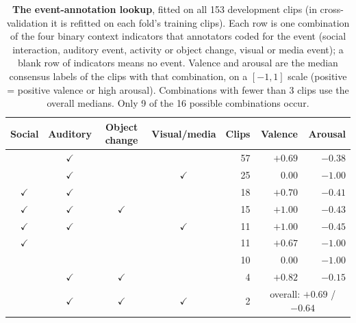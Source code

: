 \documentclass[11pt]{article}
\begin{document}
\begin{table}[!htbp]
\centering
\caption{\textbf{The event-annotation lookup}, fitted on all 153 development clips (in cross-validation it is refitted on each fold's training clips).
Each row is one combination of the four binary context indicators that annotators coded for the event (social interaction, auditory event, activity or object change, visual or media event); a blank row of indicators means no event. Valence and arousal are the median consensus labels of the clips with that combination, on a $[-1, 1]$ scale (positive = positive valence or high arousal). Combinations with fewer than 3 clips use the overall medians. Only 9 of the 16 possible combinations occur.}
\label{tab:lookup}
\begin{tabular}{ccccrrr}
\toprule
Social & Auditory & Object change & Visual/media & Clips & Valence & Arousal \\
\midrule
 & $\checkmark$ & & & 57 & $+0.69$ & $-0.38$ \\
 & $\checkmark$ & & $\checkmark$ & 25 & $0.00$ & $-1.00$ \\
$\checkmark$ & $\checkmark$ & & & 18 & $+0.70$ & $-0.41$ \\
$\checkmark$ & $\checkmark$ & $\checkmark$ & & 15 & $+1.00$ & $-0.43$ \\
$\checkmark$ & $\checkmark$ & & $\checkmark$ & 11 & $+1.00$ & $-0.45$ \\
$\checkmark$ & & & & 11 & $+0.67$ & $-1.00$ \\
 & & & & 10 & $0.00$ & $-1.00$ \\
 & $\checkmark$ & $\checkmark$ & & 4 & $+0.82$ & $-0.15$ \\
 & $\checkmark$ & $\checkmark$ & $\checkmark$ & 2 & \multicolumn{2}{c}{overall: $+0.69$ / $-0.64$} \\
\bottomrule
\end{tabular}
\end{table}

\clearpage
\end{document}
